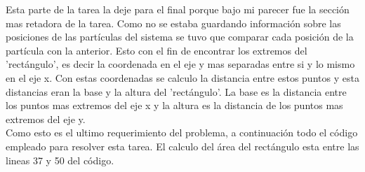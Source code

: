 \documentclass[12pt]{article}
\begin{document}
Esta parte de la tarea la deje para el final porque bajo mi parecer fue la sección mas retadora de la tarea. Como no se estaba guardando información sobre las posiciones de las partículas del sistema se tuvo que comparar cada posición de la partícula con la anterior. Esto con el fin de encontrar los extremos del 'rectángulo', es decir la coordenada en el eje y mas separadas entre si y lo mismo en el eje x. Con estas coordenadas se calculo la distancia entre estos puntos y esta distancias eran la base y la altura del 'rectángulo'. La base es la distancia entre los puntos mas extremos del eje x y la altura es la distancia de los puntos mas extremos del eje y. \\

Como esto es el ultimo requerimiento del problema, a continuación todo el código empleado para resolver esta tarea. El calculo del área del rectángulo esta entre las lineas 37 y 50 del código.  \\ 
\end{document}
